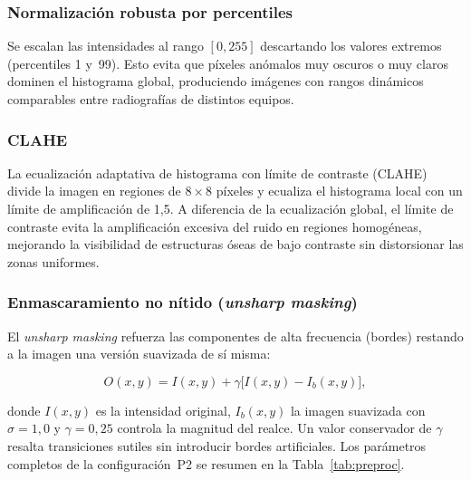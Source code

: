 \documentclass[conference]{IEEEtran}
\begin{document}
\subsubsection{Normalización robusta por percentiles}

Se escalan las intensidades al rango $[0, 255]$ descartando los valores extremos
(percentiles 1 y~99). Esto evita que píxeles anómalos muy oscuros o muy claros
dominen el histograma global, produciendo imágenes con rangos dinámicos comparables
entre radiografías de distintos equipos.

\subsubsection{CLAHE}

La ecualización adaptativa de histograma con límite de contraste (CLAHE) divide la
imagen en regiones de $8 \times 8$ píxeles y ecualiza el histograma local con un
límite de amplificación de 1{,}5. A diferencia de la ecualización global, el límite
de contraste evita la amplificación excesiva del ruido en regiones homogéneas,
mejorando la visibilidad de estructuras óseas de bajo contraste sin distorsionar
las zonas uniformes.

\subsubsection{Enmascaramiento no nítido (\textit{unsharp masking})}

El \textit{unsharp masking} refuerza las componentes de alta frecuencia (bordes)
restando a la imagen una versión suavizada de sí misma:

\begin{equation}
O(x,y) = I(x,y) + \gamma\bigl[I(x,y) - I_b(x,y)\bigr],
\label{eq:unsharp}
\end{equation}

donde $I(x,y)$ es la intensidad original, $I_b(x,y)$ la imagen suavizada con
$\sigma = 1{,}0$ y $\gamma = 0{,}25$ controla la magnitud del realce. Un valor
conservador de $\gamma$ resalta transiciones sutiles sin introducir bordes
artificiales. Los parámetros completos de la configuración~P2 se resumen en la
Tabla~\ref{tab:preproc}.
\end{document}
